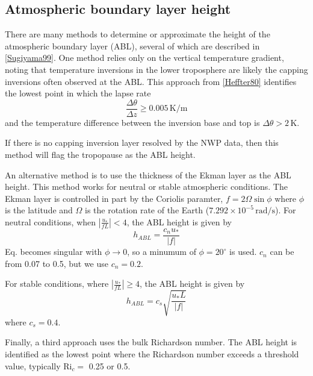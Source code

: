 \subsection{Atmospheric boundary layer height}

There are many methods to determine or approximate the height of the atmospheric boundary
layer (ABL), several of which are described in \ref{Sugiyama99}. One method relies only on the
vertical temperature gradient, noting that temperature inversions in the lower troposphere
are likely the capping inversions often observed at the ABL. This
approach from \ref{Heffter80} identifies the lowest point in which the lapse rate
\begin{equation}\label{VarDiff_Eq_ABL1}
\frac{\Delta \theta}{\Delta z} \ge 0.005 \, \mathrm{K} / \mathrm{m}
\end{equation}
and the temperature difference between the inversion base and top
is $\Delta \theta > 2 \, \mathrm{K}$.

If there is no capping inversion layer resolved by the NWP data, then this method
will flag the tropopause as the ABL height.

An alternative method is to use the thickness of the Ekman layer as the ABL height.
This method works for neutral or stable atmospheric conditions. The Ekman layer is
controlled in part by the Coriolis paramter, $f=2 \Omega \sin \phi$ where $\phi$
is the latitude and $\Omega$ is the rotation rate of the Earth
($7.292 \times 10^{-5} \, \mathrm{rad/s}$).  For neutral conditions,
when $\left| \frac{u_*}{f L}\right| < 4$, the ABL height is given by
\begin{equation}\label{VarDiff_Eq_ABL2_1}
h_{ABL} = \frac{c_n u_*}{|f|}
\end{equation}
Eq. \cite{VarDiff_Eq_ABL2_1} becomes singular with $\phi \rightarrow 0$, so a minumum
of $\phi=20^{\circ}$ is used. $c_n$ can be from 0.07 to 0.5, but we use $c_n=0.2$.

For stable conditions, where $\left| \frac{u_*}{f L}\right| \ge 4$, the ABL height is given by
\begin{equation}\label{VarDiff_Eq_ABL2_2}
h_{ABL} = c_s \sqrt{\frac{u_* L}{|f|}}
\end{equation}
where $c_s=0.4$.

Finally, a third approach uses the bulk Richardson number. The ABL height is identified as the
lowest point where the Richardson number exceeds a threshold value, typically $\mathrm{Ri}_c=$ 0.25 or
0.5.




